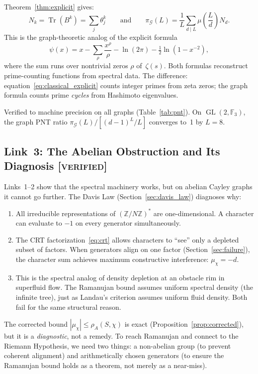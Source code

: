 \documentclass[12pt,reqno]{amsart}
\theoremstyle{plain}
\theoremstyle{definition}
\theoremstyle{remark}
\DeclareMathOperator{\Tr}{Tr}
\DeclareMathOperator{\GL}{GL}
\newcommand{\ZZ}{\mathbb{Z}}
\newcommand{\FF}{\mathbb{F}}
\begin{document}
Theorem~\ref{thm:explicit} gives:
\[
  N_k = \Tr(B^k) = \sum_j \theta_j^k
  \qquad\text{and}\qquad
  \pi_\mathcal{G}(L) = \frac{1}{L} \sum_{d \mid L}
  \mu\!\left(\frac{L}{d}\right) N_d.
\]
This is the graph-theoretic analog of the explicit formula
\begin{equation}\label{eq:classical_explicit}
  \psi(x) = x - \sum_\rho \frac{x^\rho}{\rho} - \ln(2\pi)
  - \tfrac{1}{2}\ln(1 - x^{-2}),
\end{equation}
where the sum runs over nontrivial zeros $\rho$ of~$\zeta(s)$.  Both
formulas reconstruct prime-counting functions from spectral data.  The
difference: equation~\eqref{eq:classical_explicit} counts integer
primes from zeta zeros; the graph formula counts prime \emph{cycles}
from Hashimoto eigenvalues.

Verified to machine precision on all graphs
(Table~\ref{tab:pnt}).  On $\GL(2, \FF_3)$, the graph PNT ratio
$\pi_\mathcal{G}(L) / [(d-1)^L / L]$ converges to~1 by $L = 8$.

\subsection{Link~3: The Abelian Obstruction and Its Diagnosis
  \textnormal{[\textsc{verified}]}}
\label{sec:abelian_obstruction}

Links~1--2 show that the spectral machinery works, but on abelian
Cayley graphs it cannot go further.  The Davis Law
(Section~\ref{sec:davis_law}) diagnoses why:
\begin{enumerate}[nosep]
  \item All irreducible representations of $(\ZZ/N\ZZ)^*$ are
    one-dimensional.  A character can evaluate to $-1$ on every
    generator simultaneously.
  \item The CRT factorization~\eqref{eq:crt} allows characters to
    ``see'' only a depleted subset of factors.  When generators align
    on one factor (Section~\ref{sec:failure}), the character sum
    achieves maximum constructive interference: $\mu_\chi = -d$.
  \item This is the spectral analog of density depletion at an
    obstacle rim in superfluid flow.  The Ramanujan bound assumes
    uniform spectral density (the infinite tree), just as Landau's
    criterion assumes uniform fluid density.  Both fail for the same
    structural reason.
\end{enumerate}

The corrected bound $|\mu_\chi| \leq \rho_A(S,\chi)$ is exact
(Proposition~\ref{prop:corrected}), but it is a \emph{diagnostic},
not a remedy.  To reach Ramanujan and connect to the Riemann
Hypothesis, we need two things: a non-abelian group (to prevent
coherent alignment) and arithmetically chosen generators (to ensure
the Ramanujan bound holds as a theorem, not merely as a near-miss).
\end{document}

